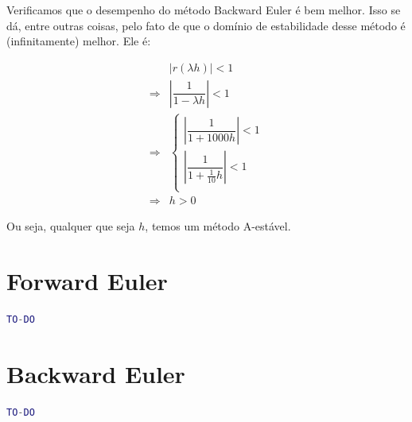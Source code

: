 \documentclass{article}
\begin{document}
\begin{enumerate}
\begin{enumerate}
                    Verificamos que o desempenho do método
                    Backward Euler é bem melhor. Isso se dá,
                    entre outras coisas, pelo fato de que
                    o domínio de estabilidade desse método é
                    (infinitamente) melhor. Ele é:

                    \begin{align*}
                        &|r(\lambda h)| < 1 \\
                        \Rightarrow &\left|\dfrac{1}{1 - \lambda h}\right| < 1 \\
                        \Rightarrow &\begin{cases}
                            \left|\dfrac{1}{1 + 1000 h}\right| < 1 \\
                            \left|\dfrac{1}{1 + \frac{1}{10} h}\right| < 1 \\
                        \end{cases} \\
                        \Rightarrow & h > 0
                    \end{align*}

                    Ou seja, qualquer que seja $h$, temos um método A-estável.

            \end{enumerate} 
    \end{enumerate}

    \clearpage

    \appendix

    \section{Forward Euler}
        \label{appendix:forward_euler}

        \begin{lstlisting}[language=Matlab]
            TO-DO
        \end{lstlisting}

    \section{Backward Euler}
        \label{appendix:backward_euler}

        \begin{lstlisting}[language=Matlab]
            TO-DO
        \end{lstlisting}
\end{document}
